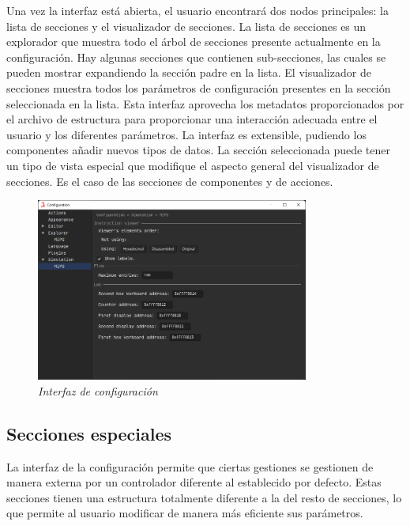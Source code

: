 Una vez la interfaz está abierta, el usuario encontrará dos nodos principales:
la lista de secciones y el visualizador de secciones.
La lista de secciones es un explorador que muestra todo el árbol de
secciones presente actualmente en la configuración.
Hay algunas secciones que contienen sub-secciones, las cuales se pueden
mostrar expandiendo la sección padre en la lista.
El visualizador de secciones muestra todos los parámetros de configuración
presentes en la sección seleccionada en la lista.
Esta interfaz aprovecha los metadatos proporcionados por el archivo
de estructura para proporcionar una interacción adecuada entre el usuario
y los diferentes parámetros.
La interfaz es extensible, pudiendo los componentes añadir nuevos tipos de datos.
La sección seleccionada puede tener un tipo de vista especial
que modifique el aspecto general del visualizador de secciones.
Es el caso de las secciones de componentes y de acciones.

\begin{figure}[H]
    \centering
    \includegraphics[width=0.8\textwidth]{images/base/jams-config}
    \caption{\textit{Interfaz de configuración}}
    \label{fig:jams-configuracion}
\end{figure}

\subsection{Secciones especiales}\label{subsec:secciones-especiales}

La interfaz de la configuración permite que ciertas gestiones se
gestionen de manera externa por un controlador diferente al establecido
por defecto.
Estas secciones tienen una estructura totalmente diferente a la
del resto de secciones, lo que permite al usuario modificar
de manera más eficiente sus parámetros.


